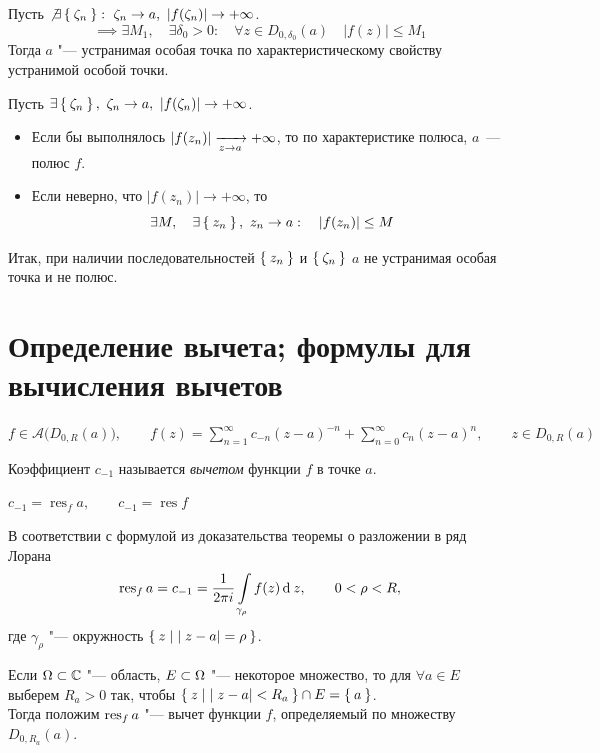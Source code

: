 \begin{iproof}
	\item Пусть $ \not\exists \Set{\zeta_n} : ~ \zeta_n \to a, ~ |f(\zeta_n)| \to +\infty $.
	$$ \implies \exists M_1, \quad \exists \delta_0 > 0 : \quad \forall z \in D_{0, \delta_0}(a) \quad |f(z)| \le M_1 $$
	Тогда $ a $ "--- устранимая особая точка по характеристическому свойству устранимой особой точки.

	\item Пусть $ \exists \Set{\zeta_n}, ~ \zeta_n \to a, ~ |f(\zeta_n)| \to +\infty $.
	\begin{itemize}
		\item Если бы выполнялось $ |f(z_n)| \xrightarrow[z \to a]{} +\infty $, то по характеристике полюса, $ a $~--- полюс $ f $.
		\item Если неверно, что $ |f(z_n)| \to +\infty $, то
		$$ \exists M, \quad \exists \Set{z_n}, ~ z_n \to a : \quad |f(z_n)| \le M $$
	\end{itemize}

	Итак, при наличии последовательностей $ \Set{z_n} $ и $ \Set{\zeta_n} $ $ a $ не устранимая особая точка и не полюс.
\end{iproof}

\section{Определение вычета; формулы для вычисления вычетов}

\begin{definition}
	$ f \in \mathcal A(D_{0, R}(a) \big), \qquad f(z) = \sum_{n = 1}^\infty c_{-n}(z - a)^{-n} + \sum_{n = 0}^\infty c_n(z - a)^n, \qquad z \in D_{0, R}(a) $

	Коэффициент $ c_{-1} $ называется \emph{вычетом} функции $ f $ в точке $ a $.
\end{definition}

\begin{notation}
	$ c_{-1} = \operatorname{res}_f a, \qquad c_{-1} = \operatorname{res} f $
\end{notation}

В соответствии с формулой  из доказательства теоремы о разложении в ряд Лорана
$$ \operatorname{res}_f a = c_{-1} = \frac1{2\pi i} \int\limits_{\gamma_\rho} f(z) \operatorname{d}^{} z, \qquad 0 < \rho < R, $$
где $ \gamma_\rho $ "--- окружность $ \Set{z \mid |z - a| = \rho} $.

Если $ \Omega \subset \mathbb{C} $ "--- область, $ E \subset \Omega $ "--- некоторое множество, то для $ \forall a \in E $ выберем $ R_a > 0 $ так, чтобы $ \Set{z \mid |z - a| < R_a} \cap E = \Set a $. \\
Тогда положим $ \operatorname{res}_f a $ "--- вычет функции $ f $, определяемый по множеству $ D_{0, R_a}(a) $.

